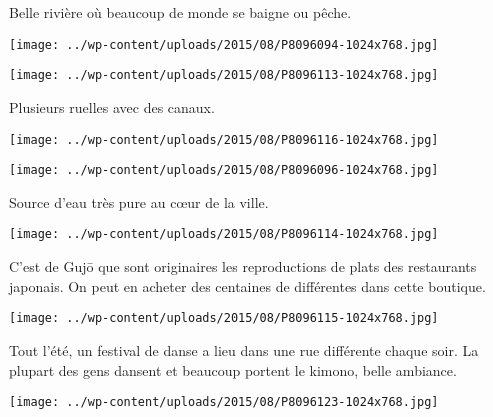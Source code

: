  Belle rivière où beaucoup de monde se baigne ou pêche. 
\begin{center} \texttt{[image: ../wp-content/uploads/2015/08/P8096094-1024x768.jpg]} \end{center}
\begin{center} \texttt{[image: ../wp-content/uploads/2015/08/P8096113-1024x768.jpg]} \end{center}

 Plusieurs ruelles avec des canaux. 
\begin{center} \texttt{[image: ../wp-content/uploads/2015/08/P8096116-1024x768.jpg]} \end{center}
\begin{center} \texttt{[image: ../wp-content/uploads/2015/08/P8096096-1024x768.jpg]} \end{center}

 Source d'eau très pure au c\oe{}ur de la ville. 
\begin{center} \texttt{[image: ../wp-content/uploads/2015/08/P8096114-1024x768.jpg]} \end{center}

\pagebreak
 C'est de Gujō que sont originaires les reproductions de plats des restaurants japonais. On peut en acheter des centaines de différentes dans cette boutique. 
\begin{center} \texttt{[image: ../wp-content/uploads/2015/08/P8096115-1024x768.jpg]} \end{center}

 Tout l'été, un festival de danse a lieu dans une rue différente chaque soir. La plupart des gens dansent et beaucoup portent le kimono, belle ambiance. 
\begin{center} \texttt{[image: ../wp-content/uploads/2015/08/P8096123-1024x768.jpg]} \end{center}
